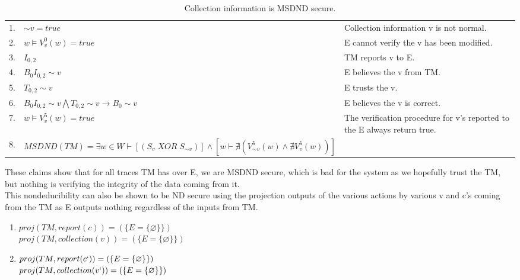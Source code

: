 \documentclass[journal,onecolumn]{IEEEtran}
\begin{document}
\begin{enumerate}
\begin{enumerate}
      \begin{table}[H]
        \caption{Collection information is MSDND secure.}
        \centering
        \begin{tabular}{lll}
        1.  & ${\sim} v = true$          & Collection information v is not normal.                                                       \\
        2.  & $w \vDash V^0_v(w) = true$ & E cannot verify the v has been modified.                                 \\
        3.  & $I_{0,2}$                 & TM reports v to E.                                                \\
        4.  & $B_0I_{0,2} {\sim} v$      & E believes the v from TM.                                     \\
        5.  & $T_{0,2} {\sim} v$         & E trusts the v.                                                          \\
        6.  & $B_0I_{0,2} {\sim} v \bigwedge T_{0,2} {\sim} v \rightarrow B_0 {\sim} v$ & E believes the v is correct.                                             \\
        7.  & $w \vDash V^5_v(w) = true$  & The verification procedure for v's reported to the E always return true. \\
        8.  & $MSDND (TM) = \exists w \in W \vdash [(S_{v} \; {XOR} \; S_{\sim v})] \wedge [w \vdash \nexists (V_{\sim v}^5 (w) \wedge \nexists V_{v}^5 (w))]$ & 
        \end{tabular}
      \end{table}

      These claims show that for all traces TM has over E, we are MSDND secure, which is bad for the system as we hopefully trust the TM, but nothing is verifying the integrity of the data coming from it. \\

      This nondeducibility can also be shown to be ND secure using the projection outputs of the various actions by various v and c's coming from the TM as E outputs nothing regardless of the inputs from TM. \\

      \begin{enumerate}
        \item $proj(TM, report(c)) = (\{E = \{\varnothing\}\})$ \\
        $proj(TM, collection(v)) = (\{E = \{\varnothing\}\})$
        \item $proj(TM, report(c`)) = (\{E = \{\varnothing\}\})$ \\
        $proj(TM, collection(v`)) = (\{E = \{\varnothing\}\})$ \\
      \end{enumerate}


\end{enumerate}
\end{enumerate}
\end{document}
